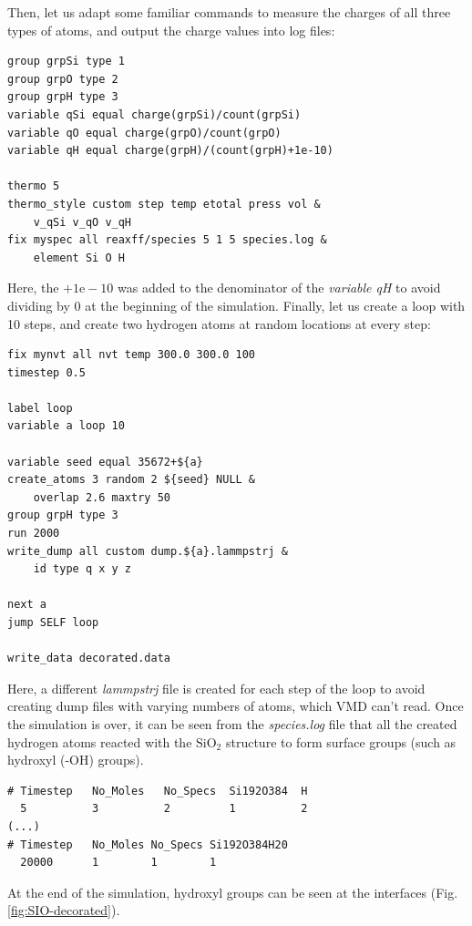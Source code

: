 \documentclass[9pt,tutorial]{livecoms}
\begin{document}
Then, let us adapt some familiar commands to measure the charges of all three types of atoms, and output the charge values into log files:
{\normalsize \begin{verbatim}
group grpSi type 1
group grpO type 2
group grpH type 3
variable qSi equal charge(grpSi)/count(grpSi)
variable qO equal charge(grpO)/count(grpO)
variable qH equal charge(grpH)/(count(grpH)+1e-10)

thermo 5
thermo_style custom step temp etotal press vol &
    v_qSi v_qO v_qH
fix myspec all reaxff/species 5 1 5 species.log &
    element Si O H
\end{verbatim}}
Here, the $+1\text{e}-10$ was added to the denominator of the \textit{variable qH} to avoid dividing by 0 at the beginning of the simulation. Finally, let us create a loop with 10 steps, and create two hydrogen atoms at random locations at every step: 
{\normalsize \begin{verbatim}
fix mynvt all nvt temp 300.0 300.0 100
timestep 0.5 

label loop
variable a loop 10

variable seed equal 35672+${a} 
create_atoms 3 random 2 ${seed} NULL &
    overlap 2.6 maxtry 50
group grpH type 3
run 2000
write_dump all custom dump.${a}.lammpstrj &
    id type q x y z

next a
jump SELF loop

write_data decorated.data
\end{verbatim}}
Here, a different \textit{lammpstrj} file is created for each step of the loop to avoid creating dump files with varying numbers of atoms, which VMD can't read. Once the simulation is over, it can be seen from the \textit{species.log} file that
all the created hydrogen atoms reacted with the $\text{SiO}_{2}$ structure to form surface groups (such as hydroxyl (-OH) groups).
{\normalsize \begin{verbatim}
# Timestep   No_Moles   No_Specs  Si192O384  H
  5          3          2         1          2
(...)
# Timestep   No_Moles No_Specs Si192O384H20
  20000      1        1        1
\end{verbatim}}
At the end of the simulation, hydroxyl groups can be seen at the interfaces (Fig.\,\ref{fig:SIO-decorated}).
\end{document}
